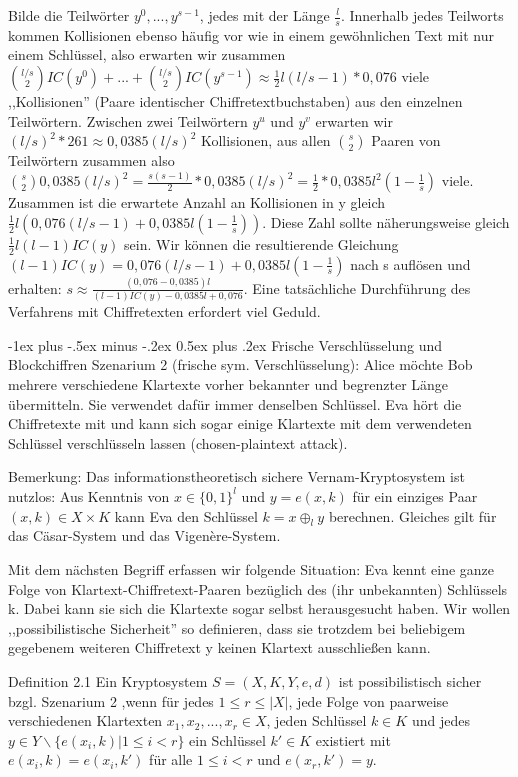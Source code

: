 \documentclass[a4paper]{article}
\makeatletter
\renewcommand{\section}{\@startsection{section}{1}{0mm}%
 {-1ex plus -.5ex minus -.2ex}%
 {0.5ex plus .2ex}%
 {\normalfont\large\bfseries}}
\makeatother
\begin{document}
\begin{multicols}{3}
   Bilde die Teilwörter $y^0,...,y^{s-1}$, jedes mit der Länge $\frac{l}{s}$. Innerhalb jedes Teilworts kommen Kollisionen ebenso häufig vor wie in einem gewöhnlichen Text mit nur einem Schlüssel, also erwarten wir zusammen $\binom{l/s}{2} IC(y^0)+...+\binom{l/s}{2} IC(y^{s-1})\approx\frac{1}{2}l(l/s-1)* 0,076$ viele ,,Kollisionen'' (Paare identischer Chiffretextbuchstaben) aus den einzelnen Teilwörtern.
    Zwischen zwei Teilwörtern $y^u$ und $y^v$ erwarten wir $(l/s)^2*261\approx 0,0385(l/s)^2$ Kollisionen, aus allen $\binom{s}{2}$ Paaren von Teilwörtern zusammen also $\binom{s}{2} 0,0385(l/s)^2 =\frac{s(s-1)}{2}* 0,0385(l/s)^2 =\frac{1}{2} *0,0385 l^2 (1-\frac{1}{s})$ viele. Zusammen ist die erwartete Anzahl an Kollisionen in y gleich $\frac{1}{2}l(0,076(l/s-1) + 0,0385 l(1-\frac{1}{s}))$.
    Diese Zahl sollte näherungsweise gleich $\frac{1}{2}l(l-1)IC(y)$ sein. Wir können die resultierende Gleichung $(l-1)IC(y) = 0,076(l/s-1) + 0,0385 l(1-\frac{1}{s})$ nach s auflösen und erhalten: $s\approx \frac{(0,076-0,0385)l}{(l-1)IC(y)-0,0385l+0,076}$.
    Eine tatsächliche Durchführung des Verfahrens mit Chiffretexten erfordert viel Geduld.

    \section{Frische Verschlüsselung und Blockchiffren}
    Szenarium 2 (frische sym. Verschlüsselung): Alice möchte Bob mehrere verschiedene Klartexte vorher bekannter und begrenzter Länge übermitteln. Sie verwendet dafür immer denselben Schlüssel. Eva hört die Chiffretexte mit und kann sich sogar einige Klartexte mit dem verwendeten Schlüssel verschlüsseln lassen (chosen-plaintext attack).

    Bemerkung: Das informationstheoretisch sichere Vernam-Kryptosystem ist nutzlos: Aus Kenntnis von $x\in\{0,1\}^l$ und $y=e(x,k)$ für ein einziges Paar $(x,k)\in X\times K$ kann Eva den Schlüssel $k=x\oplus_l y$ berechnen. Gleiches gilt für das Cäsar-System und das Vigenère-System.

    Mit dem nächsten Begriff erfassen wir folgende Situation: Eva kennt eine ganze Folge von Klartext-Chiffretext-Paaren bezüglich des (ihr unbekannten) Schlüssels k. Dabei kann sie sich die Klartexte sogar selbst herausgesucht haben. Wir wollen ,,possibilistische Sicherheit'' so definieren, dass sie trotzdem bei beliebigem gegebenem weiteren Chiffretext y keinen Klartext ausschließen kann.

    Definition 2.1 Ein Kryptosystem $S=(X,K,Y,e,d)$ ist possibilistisch sicher bzgl. Szenarium 2 ,wenn für jedes $1 \leq r\leq |X|$, jede Folge von paarweise verschiedenen Klartexten $x_1,x_2,...,x_r\in X$, jeden Schlüssel $k\in K$ und jedes $y\in Y\backslash\{e(x_i,k)| 1 \leq i < r\}$ ein Schlüssel $k'\in K$ existiert mit $e(x_i,k)=e(x_i,k')$ für alle $1\leq i< r$ und $e(x_r,k')=y$.


\end{multicols}
\end{document}
